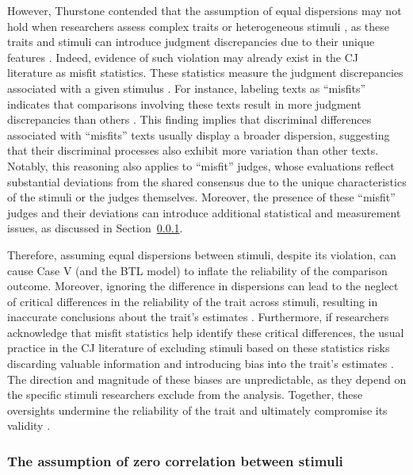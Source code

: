 \documentclass[
  authoryear,
  preprint,
  1p]{elsarticle}
\begin{document}
However, Thurstone contended that the assumption of equal dispersions
may not hold when researchers assess complex traits or heterogeneous
stimuli \citep[pp.~376]{Thurstone_1927a}, as these traits and stimuli
can introduce judgment discrepancies due to their unique features
\citep{vanDaal_et_al_2016, Lesterhuis_2018, Chambers_et_al_2022}.
Indeed, evidence of such violation may already exist in the CJ
literature as misfit statistics. These statistics measure the judgment
discrepancies associated with a given stimulus
\citetext{\citealp[pp.~12]{Pollitt_2004}; \citealp[pp.~20]{Goossens_et_al_2018}}.
For instance, labeling texts as ``misfits'' indicates that comparisons
involving these texts result in more judgment discrepancies than others
\citep{Pollitt_2012a, Pollitt_2012b, vanDaal_et_al_2016, Goossens_et_al_2018}.
This finding implies that discriminal differences associated with
``misfits'' texts usually display a broader dispersion, suggesting that
their discriminal processes also exhibit more variation than other
texts. Notably, this reasoning also applies to ``misfit'' judges, whose
evaluations reflect substantial deviations from the shared consensus due
to the unique characteristics of the stimuli or the judges themselves.
Moreover, the presence of these ``misfit'' judges and their deviations
can introduce additional statistical and measurement issues, as
discussed in Section~\ref{sec-theory-issue1b}.

Therefore, assuming equal dispersions between stimuli, despite its
violation, can cause Case V (and the BTL model) to inflate the
reliability of the comparison outcome. Moreover, ignoring the difference
in dispersions can lead to the neglect of critical differences in the
reliability of the trait across stimuli, resulting in inaccurate
conclusions about the trait's estimates \citep[pp.~370]{McElreath_2020}.
Furthermore, if researchers acknowledge that misfit statistics help
identify these critical differences, the usual practice in the CJ
literature of excluding stimuli based on these statistics
\citep{Pollitt_2012b, vanDaal_et_al_2017, Goossens_et_al_2018} risks
discarding valuable information and introducing bias into the trait's
estimates \citep[chap.~12]{Zimmerman_1994, McElreath_2020}. The
direction and magnitude of these biases are unpredictable, as they
depend on the specific stimuli researchers exclude from the analysis.
Together, these oversights undermine the reliability of the trait and
ultimately compromise its validity \citep[pp.~2]{Perron_et_al_2015}.

\subsubsection{The assumption of zero correlation between
stimuli}\label{sec-theory-issue1b}
\end{document}
